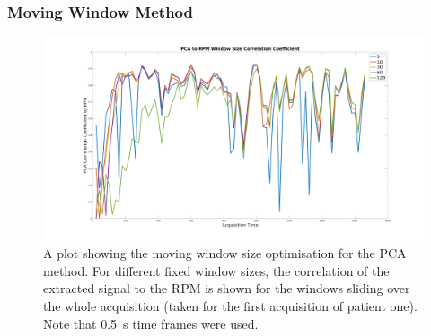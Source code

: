             \subsubsection{Moving Window Method} \label{sec:pca_data_driven_surrogate_signal_extraction_methods_for_dynamic_pet_methods_moving_window_method}
                \begin{figure}
                    \centering
                    
                    \includegraphics[width=1.0\linewidth]{figures/data_driven_surrogate_signal_extraction_methods_1_pca_window_correlation_coefficient.png}
                    
                    \captionsetup{singlelinecheck=false}
                    \caption{
                        A plot showing the moving window size optimisation for the \gls{PCA} method. For different fixed window sizes, the correlation of the extracted signal  to the \gls{RPM}  is shown for the windows sliding over the whole acquisition (taken for the first acquisition of patient one). Note that \SI{0.5}{s} time frames were used.
                    }
                    \label{fig:pca_data_driven_surrogate_signal_extraction_methods_for_dynamic_pet_methods_pca_window_correlation_coefficient}
                \end{figure}
                    
